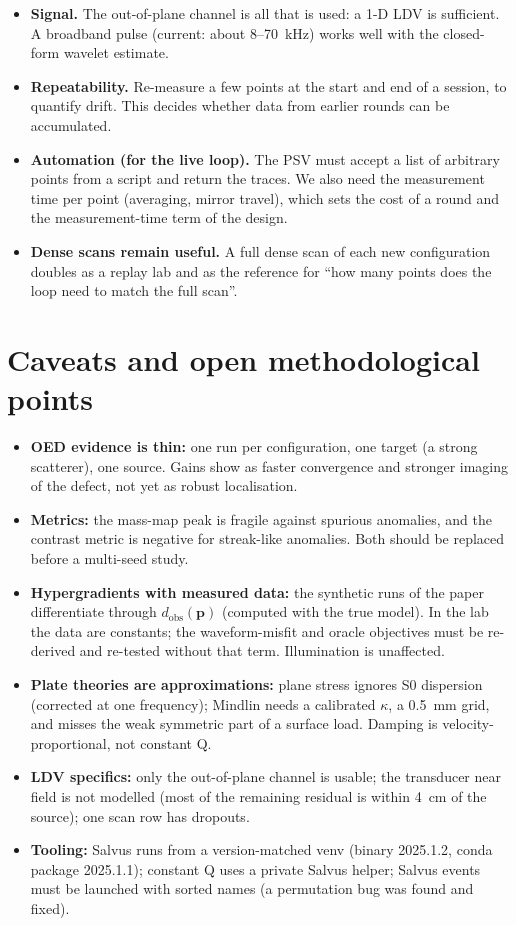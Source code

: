 \documentclass[11pt,a4paper]{article}
\begin{document}
\begin{itemize}
        sufficient.
  \item \textbf{Signal.} The out-of-plane channel is all that is used: a 1-D LDV is sufficient. A broadband pulse
        (current: about 8--70~kHz) works well with the closed-form wavelet estimate.
  \item \textbf{Repeatability.} Re-measure a few points at the start and end of a session, to quantify drift. This
        decides whether data from earlier rounds can be accumulated.
  \item \textbf{Automation (for the live loop).} The PSV must accept a list of arbitrary points from a script and return
        the traces. We also need the measurement time per point (averaging, mirror travel), which sets the cost of a
        round and the measurement-time term of the design.
  \item \textbf{Dense scans remain useful.} A full dense scan of each new configuration doubles as a replay lab and as
        the reference for ``how many points does the loop need to match the full scan''.
\end{itemize}

\FloatBarrier
\section{Caveats and open methodological points}
\begin{itemize}
  \item \textbf{OED evidence is thin:} one run per configuration, one target (a strong scatterer), one source. Gains
        show as faster convergence and stronger imaging of the defect, not yet as robust localisation.
  \item \textbf{Metrics:} the mass-map peak is fragile against spurious anomalies, and the contrast metric is negative for
        streak-like anomalies. Both should be replaced before a multi-seed study.
  \item \textbf{Hypergradients with measured data:} the synthetic runs of the paper differentiate through
        $d_{\mathrm{obs}}(\mathbf p)$ (computed with the true model). In the lab the data are constants; the
        waveform-misfit and oracle objectives must be re-derived and re-tested without that term. Illumination is
        unaffected.
  \item \textbf{Plate theories are approximations:} plane stress ignores S0 dispersion (corrected at one frequency);
        Mindlin needs a calibrated $\kappa$, a 0.5~mm grid, and misses the weak symmetric part of a surface load.
        Damping is velocity-proportional, not constant Q.
  \item \textbf{LDV specifics:} only the out-of-plane channel is usable; the transducer near field is not modelled
        (most of the remaining residual is within 4~cm of the source); one scan row has dropouts.
  \item \textbf{Tooling:} Salvus runs from a version-matched venv (binary 2025.1.2, conda package 2025.1.1); constant Q
        uses a private Salvus helper; Salvus events must be launched with sorted names (a permutation bug was found
        and fixed).
\end{itemize}
\end{document}
